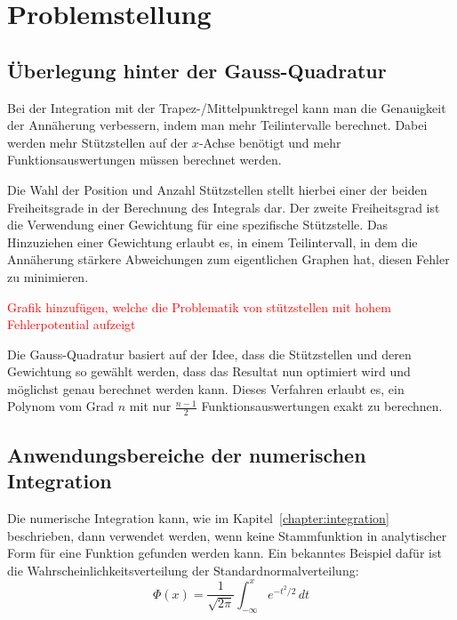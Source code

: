 %
%
%
\section{Problemstellung
\label{quadratur:section:problemstellung}}
\subsection{Überlegung hinter der Gauss-Quadratur \label{quadratur:subsection:ueberlegung}}

Bei der Integration mit der Trapez-/Mittelpunktregel kann man die Genauigkeit
der Annäherung verbessern, indem man mehr Teilintervalle berechnet.
Dabei werden mehr Stützstellen auf der $x$-Achse benötigt und mehr Funktionsauswertungen
müssen berechnet werden.

Die Wahl der Position und Anzahl Stützstellen stellt hierbei einer der beiden Freiheitsgrade
in der Berechnung des Integrals dar.
Der zweite Freiheitsgrad ist die Verwendung einer Gewichtung für eine spezifische Stützstelle.
Das Hinzuziehen einer Gewichtung erlaubt es, in einem Teilintervall, 
in dem die Annäherung stärkere Abweichungen zum eigentlichen Graphen hat, 
diesen Fehler zu minimieren. 

\textcolor{red}{Grafik hinzufügen, welche die Problematik von stützstellen mit hohem Fehlerpotential aufzeigt}

Die Gauss-Quadratur basiert auf der Idee, dass die Stützstellen und deren Gewichtung so gewählt werden,
dass das Resultat nun optimiert wird und möglichst genau berechnet werden kann.
Dieses Verfahren erlaubt es, ein Polynom vom Grad $n$ mit nur $\frac{n-1}{2}$
Funktionsauswertungen exakt zu berechnen.

\subsection{Anwendungsbereiche der numerischen Integration \label{quadratur:subsection:anwendungsbereiche}}
Die numerische Integration kann, wie im Kapitel~\ref{chapter:integration} beschrieben, dann verwendet
werden, wenn keine Stammfunktion in analytischer Form für eine Funktion gefunden werden kann.
Ein bekanntes Beispiel dafür ist die Wahrscheinlichkeitsverteilung der Standardnormalverteilung:
\begin{equation}
\Phi(x) 
=
\frac{1}{\sqrt{2\pi}}
\int_{-\infty}^x e^{-t^2/2}\,dt
\end{equation}

